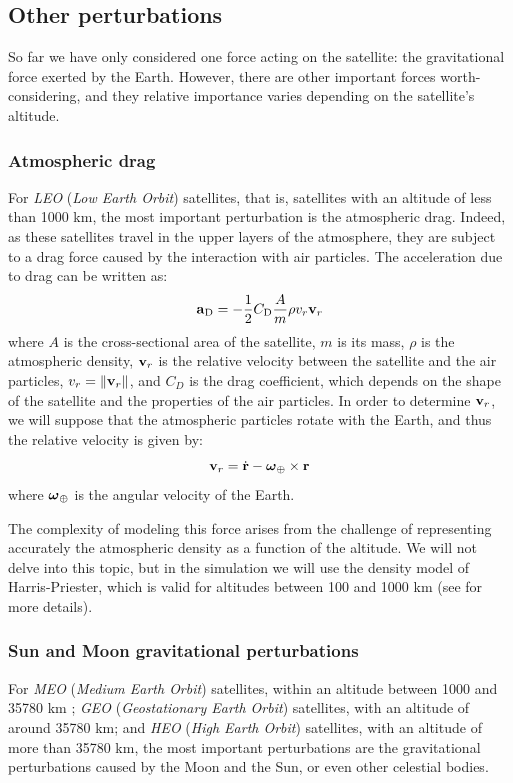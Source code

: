 \documentclass[../main.tex]{subfiles}
\begin{document}
\subsection{Other perturbations}
So far we have only considered one force acting on the satellite: the gravitational force exerted by the Earth. However, there are other important forces worth-considering, and they relative importance varies depending on the satellite's altitude.

\subsubsection{Atmospheric drag}
For \emph{LEO} (\emph{Low Earth Orbit}) satellites, that is, satellites with an altitude of less than 1000 km, the most important perturbation is the atmospheric drag. Indeed, as these satellites travel in the upper layers of the atmosphere, they are subject to a drag force caused by the interaction with air particles. The acceleration due to drag can be written as:
\begin{equation}
  \boldsymbol{\mathrm{a}}_{\mathrm{D}}=-\frac{1}{2}C_{\mathrm{D}}\frac{A}{m}\rho v_r\boldsymbol{\mathrm{v}}_r
\end{equation}
where $A$ is the cross-sectional area of the satellite, $m$ is its mass, $\rho$ is the atmospheric density, $\boldsymbol{\mathrm{v}}_r$ is the relative velocity between the satellite and the air particles, $v_r=\left\|\boldsymbol{\mathrm{v}}_r\right\|$, and $C_D$ is the drag coefficient, which depends on the shape of the satellite and the properties of the air particles. In order to determine $\boldsymbol{\mathrm{v}}_r$, we will suppose that the atmospheric particles rotate with the Earth, and thus the relative velocity is given by:
\begin{equation}
  \boldsymbol{\mathrm{v}}_r=\dot{\boldsymbol{\mathrm{r}}}-\boldsymbol{\mathrm{\omega}}_\oplus\times\boldsymbol{\mathrm{r}}
\end{equation}
where $\boldsymbol{\mathrm{\omega}}_\oplus$ is the angular velocity of the Earth.

The complexity of modeling this force arises from the challenge of representing accurately the atmospheric density as a function of the altitude. We will not delve into this topic, but in the simulation we will use the density model of Harris-Priester, which is valid for altitudes between 100 and 1000 km (see \cite{montenbruck} for more details).

\subsubsection{Sun and Moon gravitational perturbations}
For \emph{MEO} (\emph{Medium Earth Orbit}) satellites, within an altitude between 1000 and 35780 km \cite{vallado}; \emph{GEO} (\emph{Geostationary Earth Orbit}) satellites, with an altitude of around 35780 km; and \emph{HEO} (\emph{High Earth Orbit}) satellites, with an altitude of more than 35780 km, the most important perturbations are the gravitational perturbations caused by the Moon and the Sun, or even other celestial bodies.
\end{document}
